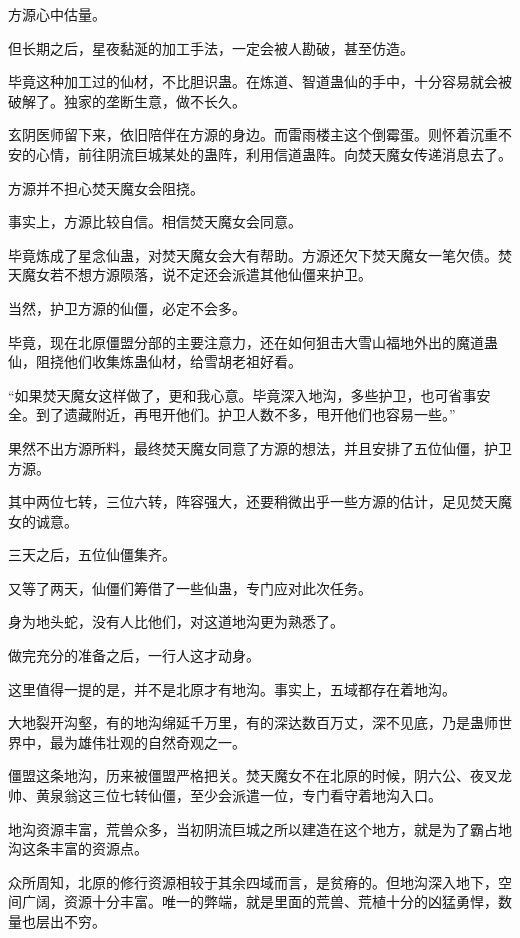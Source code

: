 \begin{this_body}
方源心中估量。

但长期之后，星夜黏涎的加工手法，一定会被人勘破，甚至仿造。

毕竟这种加工过的仙材，不比胆识蛊。在炼道、智道蛊仙的手中，十分容易就会被破解了。独家的垄断生意，做不长久。

玄阴医师留下来，依旧陪伴在方源的身边。而雷雨楼主这个倒霉蛋。则怀着沉重不安的心情，前往阴流巨城某处的蛊阵，利用信道蛊阵。向焚天魔女传递消息去了。

方源并不担心焚天魔女会阻挠。

事实上，方源比较自信。相信焚天魔女会同意。

毕竟炼成了星念仙蛊，对焚天魔女会大有帮助。方源还欠下焚天魔女一笔欠债。焚天魔女若不想方源陨落，说不定还会派遣其他仙僵来护卫。

当然，护卫方源的仙僵，必定不会多。

毕竟，现在北原僵盟分部的主要注意力，还在如何狙击大雪山福地外出的魔道蛊仙，阻挠他们收集炼蛊仙材，给雪胡老祖好看。

“如果焚天魔女这样做了，更和我心意。毕竟深入地沟，多些护卫，也可省事安全。到了遗藏附近，再甩开他们。护卫人数不多，甩开他们也容易一些。”

果然不出方源所料，最终焚天魔女同意了方源的想法，并且安排了五位仙僵，护卫方源。

其中两位七转，三位六转，阵容强大，还要稍微出乎一些方源的估计，足见焚天魔女的诚意。

三天之后，五位仙僵集齐。

又等了两天，仙僵们筹借了一些仙蛊，专门应对此次任务。

身为地头蛇，没有人比他们，对这道地沟更为熟悉了。

做完充分的准备之后，一行人这才动身。

这里值得一提的是，并不是北原才有地沟。事实上，五域都存在着地沟。

大地裂开沟壑，有的地沟绵延千万里，有的深达数百万丈，深不见底，乃是蛊师世界中，最为雄伟壮观的自然奇观之一。

僵盟这条地沟，历来被僵盟严格把关。焚天魔女不在北原的时候，阴六公、夜叉龙帅、黄泉翁这三位七转仙僵，至少会派遣一位，专门看守着地沟入口。

地沟资源丰富，荒兽众多，当初阴流巨城之所以建造在这个地方，就是为了霸占地沟这条丰富的资源点。

众所周知，北原的修行资源相较于其余四域而言，是贫瘠的。但地沟深入地下，空间广阔，资源十分丰富。唯一的弊端，就是里面的荒兽、荒植十分的凶猛勇悍，数量也层出不穷。


\end{this_body}
